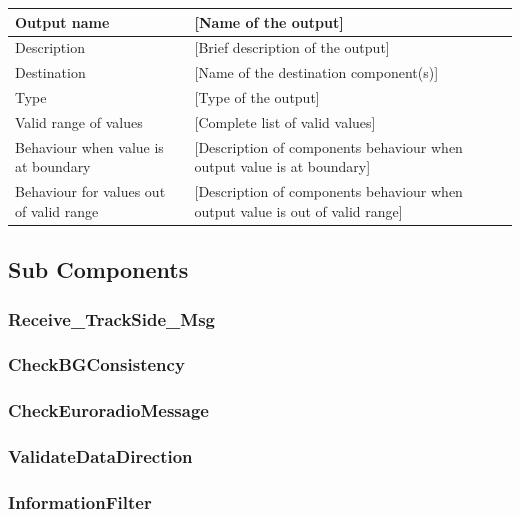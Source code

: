 \begin{longtable}{p{}p{}}
\toprule
Output name				& [Name of the output] \\
\midrule
Description				& [Brief description of the output] \\
\midrule
Destination				& [Name of the destination component(s)] \\ 
\midrule
Type					& [Type of the output] \\
\midrule
Valid range of values	& [Complete list of valid values] \\
\midrule
Behaviour when value is at boundary	& [Description of components behaviour when output value is at boundary] \\
\midrule
Behaviour for values out of valid range	& [Description of components behaviour when output value is out of valid range] \\
\bottomrule
\end{longtable}


\subsection{Sub Components}

\subsubsection{Receive\_TrackSide\_Msg}


\subsubsection{CheckBGConsistency}


\subsubsection{CheckEuroradioMessage}


\subsubsection{ValidateDataDirection}


\subsubsection{InformationFilter}

